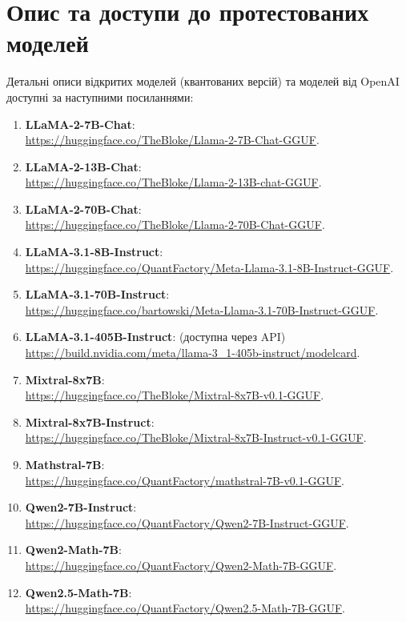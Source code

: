 \chapter{Опис та доступи до протестованих моделей}
\label{sec:models-tested-links}
\vspace*{-1\baselineskip}
Детальні описи відкритих моделей (квантованих версій) та моделей від OpenAI доступні за наступними посиланнями:
\begin{enumerate}
    \item \textbf{LLaMA-2-7B-Chat}:\\
    \url{https://huggingface.co/TheBloke/Llama-2-7B-Chat-GGUF}.
    \item \textbf{LLaMA-2-13B-Chat}:\\
    \url{https://huggingface.co/TheBloke/Llama-2-13B-chat-GGUF}.
    \item \textbf{LLaMA-2-70B-Chat}:\\
    \url{https://huggingface.co/TheBloke/Llama-2-70B-Chat-GGUF}.
    \item \textbf{LLaMA-3.1-8B-Instruct}: \\
    \url{https://huggingface.co/QuantFactory/Meta-Llama-3.1-8B-Instruct-GGUF}.
    \item \textbf{LLaMA-3.1-70B-Instruct}:\\
    \url{https://huggingface.co/bartowski/Meta-Llama-3.1-70B-Instruct-GGUF}.
    \item \textbf{LLaMA-3.1-405B-Instruct}: (доступна через API)\\
    \url{https://build.nvidia.com/meta/llama-3_1-405b-instruct/modelcard}. 

    \item \textbf{Mixtral-8x7B}:\\
    \url{https://huggingface.co/TheBloke/Mixtral-8x7B-v0.1-GGUF}.
    \item \textbf{Mixtral-8x7B-Instruct}:\\
    \url{https://huggingface.co/TheBloke/Mixtral-8x7B-Instruct-v0.1-GGUF}.
    \item \textbf{Mathstral-7B}: \\
    \url{https://huggingface.co/QuantFactory/mathstral-7B-v0.1-GGUF}.

    \item \textbf{Qwen2-7B-Instruct}: \\
    \url{https://huggingface.co/QuantFactory/Qwen2-7B-Instruct-GGUF}.
    \item \textbf{Qwen2-Math-7B}: \\
    \url{https://huggingface.co/QuantFactory/Qwen2-Math-7B-GGUF}.
    \item \textbf{Qwen2.5-Math-7B}: \\
    \url{https://huggingface.co/QuantFactory/Qwen2.5-Math-7B-GGUF}.
    

\end{enumerate}
